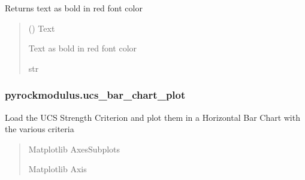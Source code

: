\documentclass[letterpaper,10pt,english]{sphinxmanual}
\begin{document}

\begin{fulllineitems}
\label{\detokenize{pyrockmodulus:pyrockmodulus.formatting_codes.red_text}}
\pysigstartsignatures
{}
\pysigstopsignatures
\sphinxAtStartPar
Returns text as bold in red font color
\begin{quote}\begin{description}
\sphinxAtStartPar
{} () \textendash{} Text

\sphinxAtStartPar
Text as bold in red font color

\sphinxAtStartPar
str

\end{description}\end{quote}

\end{fulllineitems}



\subsubsection{pyrockmodulus.ucs\_bar\_chart\_plot}
\label{\detokenize{pyrockmodulus:module-pyrockmodulus.ucs_bar_chart_plot}}\label{\detokenize{pyrockmodulus:pyrockmodulus-ucs-bar-chart-plot}}

\begin{fulllineitems}
\label{\detokenize{pyrockmodulus:pyrockmodulus.ucs_bar_chart_plot.initial_processing}}
\pysigstartsignatures
{}
\pysigstopsignatures
\sphinxAtStartPar
Load the UCS Strength Criterion and plot them in a Horizontal Bar Chart with the various criteria
\begin{quote}\begin{description}
\sphinxAtStartPar
Matplotlib AxesSubplots

\sphinxAtStartPar
Matplotlib Axis

\end{description}\end{quote}

\end{fulllineitems}
\end{document}
